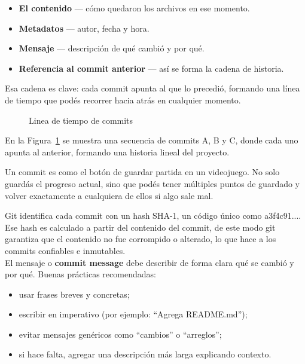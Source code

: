 \documentclass[a4paper,12pt]{report}
\begin{document}
\begin{itemize}
  \item \textbf{El contenido} — cómo quedaron los archivos en ese momento.
  \item \textbf{Metadatos} — autor, fecha y hora.
  \item \textbf{Mensaje} — descripción de qué cambió y por qué.
  \item \textbf{Referencia al commit anterior} — así se forma la cadena de historia.
\end{itemize}

Esa cadena es clave: cada commit apunta al que lo precedió, formando una línea de tiempo que podés
recorrer hacia atrás en cualquier momento.

\begin{figure}[h]
  \centering
  \caption{Linea de tiempo de commits}
  \label{fig:commit_dag}
\end{figure}

En la Figura~\ref{fig:commit_dag} se muestra una secuencia de commits A, B y C, donde cada uno apunta
al anterior, formando una historia lineal del proyecto.

Un commit es como el botón de guardar partida en un videojuego. No solo guardás
el progreso actual, sino que podés tener múltiples puntos de guardado y volver exactamente a
cualquiera de ellos si algo sale mal.


Git identifica cada commit con un hash SHA-1, un código único como a3f4c91....
Ese hash es calculado a partir del contenido del commit, de este modo git garantiza que el contenido
no fue corrompido o alterado, lo que hace a los commits confiables e inmutables. \\

El mensaje o \textbf{commit message} debe describir de forma clara qué se cambió y por qué.
Buenas prácticas recomendadas:
\begin{itemize}
  \item usar frases breves y concretas;
  \item escribir en imperativo (por ejemplo: ``Agrega README.md'');
  \item evitar mensajes genéricos como ``cambios'' o ``arreglos'';
  \item si hace falta, agregar una descripción más larga explicando contexto.
\end{itemize}
\end{document}
